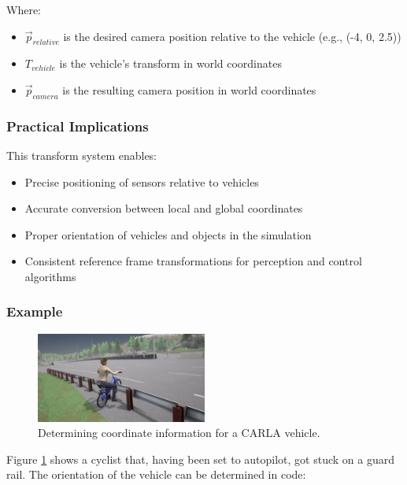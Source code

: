 Where:
\begin{itemize}
    \item $\vec{p}_{relative}$ is the desired camera position relative to the vehicle (e.g., (-4, 0, 2.5))
    \item $T_{vehicle}$ is the vehicle's transform in world coordinates
    \item $\vec{p}_{camera}$ is the resulting camera position in world coordinates
\end{itemize}

\subsubsection{Practical Implications}
This transform system enables:
\begin{itemize}
    \item Precise positioning of sensors relative to vehicles
    \item Accurate conversion between local and global coordinates
    \item Proper orientation of vehicles and objects in the simulation
    \item Consistent reference frame transformations for perception and control algorithms
\end{itemize}

\subsubsection{Example}

\begin{figure}[h!]
    \centering
    \includegraphics[width=0.50\textwidth]{Figures/Methods/Carla_stuck_cyclist.png}
    \caption{Determining coordinate information for a CARLA vehicle.}
    \label{fig:Carla_stuck_cyclist}
\end{figure}

Figure \ref{fig:Carla_stuck_cyclist} shows a cyclist that, having been set to autopilot, got stuck on a guard rail. The orientation of the vehicle can be determined in code:

